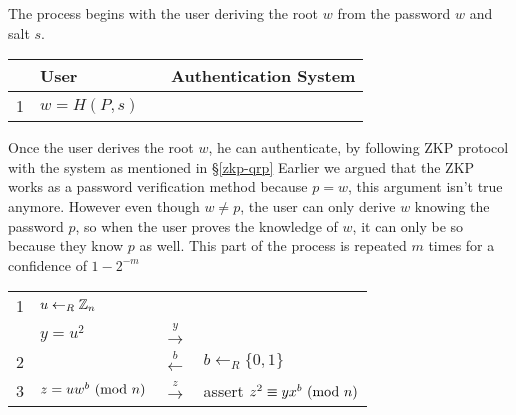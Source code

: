 \bigskip
\noindent
The process begins with the user deriving the root $w$ from the password $w$ and salt $s$.

\begin{table}[h!]
	\centering
	\begin{tabular}{p{}|p{}|p{}|p{}}
  		& User & & Authentication System\\
  		\hline
		1 & $w = H(P, s)$ & & \\ 
	\end{tabular}
\end{table}

\noindent
Once the user derives the root $w$, he can authenticate, by following ZKP protocol with the system as mentioned in \S\ref{zkp-qrp}
Earlier we argued that the ZKP works as a password verification method because $p = w$, this argument isn't true anymore.
However even though $w \not = p$, the user can only derive $w$ knowing the password $p$, so when the user proves the knowledge of $w$, it can only be so because they know $p$ as well.
This part of the process is repeated $m$ times for a confidence of $1 - 2^{-m}$

\begin{table}[h!]
	\centering
	\begin{tabular}{p{}|p{}|p{}|p{}}
  		&  & & \\
		\hline
		1 & $u \leftarrow_R \Bbb{Z}_{n}$ &  \\
		& $y = u^2$ & $\xrightarrow{y}$ \\
		2 & & $\xleftarrow{b}$ & $b \leftarrow_R \{0, 1\} $ \\
		3 & $z = uw^b \ (\mathrm{mod}\ n) $ & $\xrightarrow{z}$ & assert $z^2 \equiv yx^b \ (\mathrm{mod}\ n)$\\ 
	\end{tabular}
\end{table}

